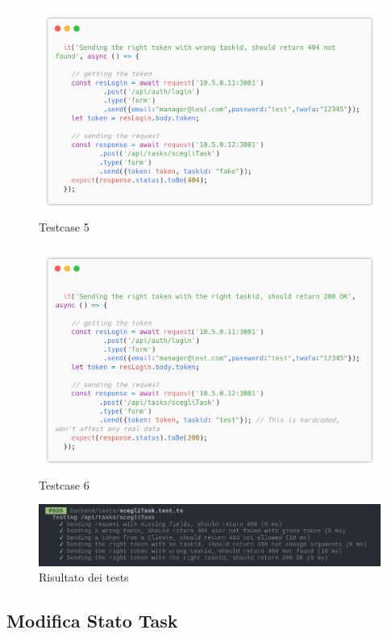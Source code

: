 \documentclass{report}
\begin{document}
\begin{figure}[H]
	\centering\includegraphics[width=1\textwidth]{images/code_scegli_task_test5.png}
	Testcase 5
\end{figure}
\begin{figure}[H]
	\centering\includegraphics[width=1\textwidth]{images/code_scegli_task_test6.png}
	Testcase 6
\end{figure}

\begin{figure}[H]
	\centering\includegraphics[width=1\textwidth]{images/jest_scegli_task.png}
	Risultato dei tests
\end{figure}


\subsection{Modifica Stato Task}
\end{document}
